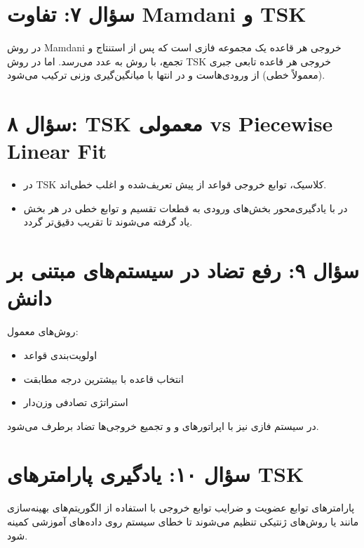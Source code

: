 \documentclass[12pt,a4paper]{article}
\begin{document}
	\section*{سؤال ۷: تفاوت Mamdani و TSK}
	در روش Mamdani خروجی هر قاعده یک مجموعه فازی است که پس از استنتاج و تجمع، با روش  به عدد می‌رسد. اما در روش TSK خروجی هر قاعده تابعی جبری (معمولاً خطی) از ورودی‌هاست و در انتها با میانگین‌گیری وزنی ترکیب می‌شود.
	
	\section*{سؤال ۸: TSK معمولی vs Piecewise Linear Fit}
	\begin{itemize}
		\item در TSK کلاسیک، توابع خروجی قواعد از پیش تعریف‌شده و اغلب خطی‌اند.
		\item در  با یادگیری‌محور بخش‌های ورودی به قطعات تقسیم و توابع خطی در هر بخش یاد گرفته می‌شوند تا تقریب دقیق‌تر گردد.
	\end{itemize}
	
	\section*{سؤال ۹: رفع تضاد در سیستم‌های مبتنی بر دانش}
	روش‌های معمول:
	\begin{itemize}
		\item اولویت‌بندی قواعد
		\item انتخاب قاعده با بیشترین درجه مطابقت
		\item استراتژی تصادفی وزن‌دار
	\end{itemize}
	در سیستم فازی نیز با اپراتورهای  و  و تجمیع خروجی‌ها تضاد برطرف می‌شود.
	
	\section*{سؤال ۱۰: یادگیری پارامترهای TSK}
	پارامترهای توابع عضویت و ضرایب توابع خروجی با استفاده از الگوریتم‌های بهینه‌سازی مانند  یا روش‌های ژنتیکی تنظیم می‌شوند تا خطای سیستم روی داده‌های آموزشی کمینه شود.
	
\end{document}
